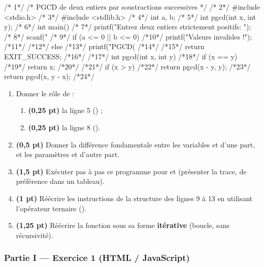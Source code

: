 \begin{codec}
/* 1*/  /* PGCD de deux entiers par soustractions successives */
/* 2*/  #include <stdio.h>
/* 3*/  #include <stdlib.h>
/* 4*/  int a, b;
/* 5*/  int pgcd(int x, int y);
/* 6*/  int main() {
/* 7*/      printf("Entrez deux entiers strictement positifs: ");
/* 8*/      scanf("%
/* 9*/      if (a <= 0 || b <= 0) {
/*10*/          printf("Valeurs invalides !\n");
/*11*/      }
/*12*/      else {
/*13*/          printf("PGCD(%
/*14*/      }
/*15*/      return EXIT_SUCCESS;
/*16*/  }
/*17*/  int pgcd(int x, int y) {
/*18*/      if (x == y) {
/*19*/          return x;
/*20*/      }
/*21*/      if (x > y)
/*22*/          return pgcd(x - y, y);
/*23*/      return pgcd(x, y - x);
/*24*/  }
\end{codec}

\begin{enumerate}[label=\textbf{\arabic*.}]
\item Donner le rôle de :
  \begin{enumerate}[label=\textbf{1.\arabic*}]
  \item \textbf{(0,25 pt)} la ligne 5 () ;
  \item \textbf{(0,25 pt)} la ligne 8 ().
  \end{enumerate}
\item \textbf{(0,5 pt)} Donner la différence fondamentale entre les variables  et
 d'une part, et les paramètres  et  d'autre part.
\item \textbf{(1,5 pt)} Exécuter pas à pas ce programme pour  et 
(présenter la trace, de préférence dans un tableau).
\item \textbf{(1 pt)} Réécrire les instructions de la structure  des lignes
9 à 13 en utilisant l'opérateur ternaire ().
\item \textbf{(1,25 pt)} Réécrire la fonction  sous sa forme \textbf{itérative}
(boucle, sans récursivité).
\end{enumerate}


\subsubsection*{Partie I — Exercice 1 (HTML / JavaScript)}

